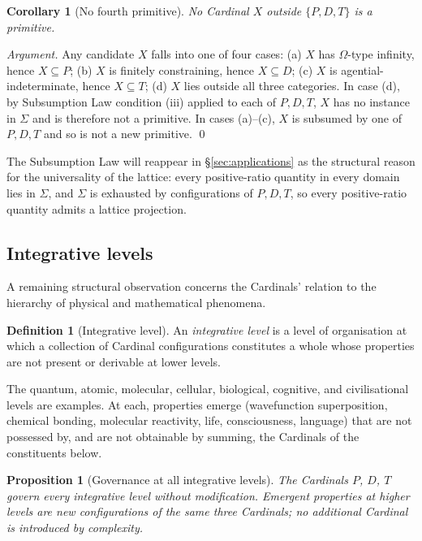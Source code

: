 \documentclass[11pt,a4paper]{article}
\newtheorem{corollary}[theorem]{Corollary}
\newtheorem{proposition}[theorem]{Proposition}
\theoremstyle{definition}
\newtheorem{definition}[theorem]{Definition}
\theoremstyle{remark}
\begin{document}
\begin{corollary}[No fourth primitive]\label{cor:nofourth}
No Cardinal $X$ outside $\{P,D,T\}$ is a primitive.
\end{corollary}

\begin{proof}[Argument]
Any candidate $X$ falls into one of four cases: (a) $X$ has $\Omega$-type infinity, hence $X \subseteq P$; (b) $X$ is finitely constraining, hence $X \subseteq D$; (c) $X$ is agential-indeterminate, hence $X \subseteq T$; (d) $X$ lies outside all three categories. In case (d), by Subsumption Law condition (iii) applied to each of $P,D,T$, $X$ has no instance in $\Sigma$ and is therefore not a primitive. In cases (a)--(c), $X$ is subsumed by one of $P,D,T$ and so is not a new primitive. \qed
\end{proof}

The Subsumption Law will reappear in \S\ref{sec:applications} as the structural reason for the universality of the lattice: every positive-ratio quantity in every domain lies in $\Sigma$, and $\Sigma$ is exhausted by configurations of $P,D,T$, so every positive-ratio quantity admits a lattice projection.

\subsection{Integrative levels}\label{subsec:levels}

A remaining structural observation concerns the Cardinals' relation to the hierarchy of physical and mathematical phenomena.

\begin{definition}[Integrative level]\label{def:levels}
An \emph{integrative level} is a level of organisation at which a collection of Cardinal configurations constitutes a whole whose properties are not present or derivable at lower levels.
\end{definition}

The quantum, atomic, molecular, cellular, biological, cognitive, and civilisational levels are examples. At each, properties emerge (wavefunction superposition, chemical bonding, molecular reactivity, life, consciousness, language) that are not possessed by, and are not obtainable by summing, the Cardinals of the constituents below.

\begin{proposition}[Governance at all integrative levels]\label{prop:governance}
The Cardinals $P$, $D$, $T$ govern every integrative level without modification. Emergent properties at higher levels are new configurations of the same three Cardinals; no additional Cardinal is introduced by complexity.
\end{proposition}
\end{document}
